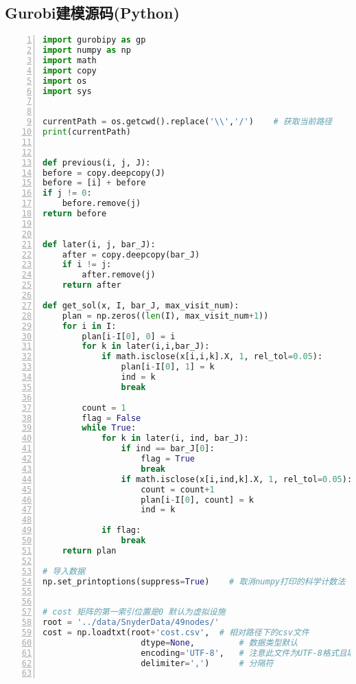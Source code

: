 \subsection*{Gurobi建模源码(Python)}
\vspace{-20pt}
\begin{lstlisting}[language=Python,
    breaklines=true, % 自动换行
    frame = leftline,
    linewidth = \textwidth,
    texcl = false,
    columns=flexible,
    lineskip=1pt,
    keywordstyle=\color{blue!90}\bfseries, %代码关键字的颜色为蓝色，粗体
    numbers=left,%左侧显示行号
    numberstyle=\small, %行号字体用小号
    showspaces=false, %
    fontadjust,
    basicstyle = \fontspec{Times New Roman},
    basicstyle = \songti
    ]
import gurobipy as gp
import numpy as np
import math
import copy
import os
import sys


currentPath = os.getcwd().replace('\\','/')    # 获取当前路径
print(currentPath)


def previous(i, j, J):
before = copy.deepcopy(J)
before = [i] + before
if j != 0:
    before.remove(j)
return before


def later(i, j, bar_J):
    after = copy.deepcopy(bar_J)
    if i != j:
        after.remove(j)
    return after

def get_sol(x, I, bar_J, max_visit_num):
    plan = np.zeros((len(I), max_visit_num+1))
    for i in I:
        plan[i-I[0], 0] = i
        for k in later(i,i,bar_J):
            if math.isclose(x[i,i,k].X, 1, rel_tol=0.05):
                plan[i-I[0], 1] = k
                ind = k
                break
        
        count = 1
        flag = False
        while True:
            for k in later(i, ind, bar_J):
                if ind == bar_J[0]:
                    flag = True
                    break
                if math.isclose(x[i,ind,k].X, 1, rel_tol=0.05):
                    count = count+1
                    plan[i-I[0], count] = k
                    ind = k
            
            if flag:
                break
    return plan

# 导入数据
np.set_printoptions(suppress=True)    # 取消numpy打印的科学计数法


# cost 矩阵的第一索引位置是0 默认为虚拟设施
root = '../data/SnyderData/49nodes/'
cost = np.loadtxt(root+'cost.csv',  # 相对路径下的csv文件
                    dtype=None,         # 数据类型默认
                    encoding='UTF-8',   # 注意此文件为UTF-8格式且取消BOM
                    delimiter=',')      # 分隔符


\end{lstlisting}

